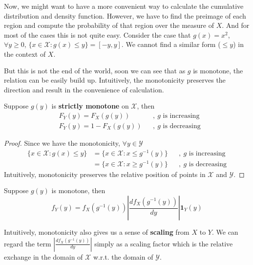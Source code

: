 \documentclass[11pt]{article}
\begin{document}
Now, we might want to have a more convenient way to calculate the cumulative distribution and density function. However, we have to find the preimage of each region and compute the probability of that region over the measure of $X$. And for most of the cases this is not quite easy. Consider the case that $g(x) = x^2$, $\forall y\geq 0$, $\{x\in\mathcal{X}:g(x)\leq y \} = [-y,y]$. We cannot find a similar form ($\leq y$) in the context of $X$.

But this is not the end of the world, soon we can see that as $g$ is monotone, the relation can be easily build up. Intuitively, the monotonicity preserves the direction and result in the convenience of calculation.

\begin{property}
	Suppose $g(y)$ is {\bf strictly monotone} on $\mathcal{X}$, then
	\begin{align*}
	&F_Y(y) = F_X(g(y))&&,\ g\mbox{ is increasing}\\
	&F_Y(y) = 1- F_X(g(y))&&,\ g\mbox{ is decreasing}
	\end{align*}
\end{property}
\begin{proof}
	Since we have the monotonicity, $\forall y\in\mathcal{Y}$
	\begin{align*}
	\{x\in\mathcal{X}: g(x)\leq y \} &= \{x\in\mathcal{X}: x\leq g^{-1}(y) \}&&,\ g\mbox{ is increasing}\\
	&= \{x\in\mathcal{X}: x\geq g^{-1}(y) \}&&,\ g\mbox{ is decreasing}
	\end{align*}
	Intuitively, monotonicity preserves the relative position of points in $\mathcal{X}$ and $\mathcal{Y}$.
\end{proof}

\begin{property}
	Suppose $g(y)$ is monotone, then
	$$f_Y(y) = f_X(g^{-1}(y)) |\frac{df_X(g^{-1}(y))}{dy}| \mathbf{1}_Y(y)$$
\end{property}
Intuitively, monotonicity also gives us a sense of {\bf scaling} from $X$ to $Y$. We can regard the term $|\frac{df_X(g^{-1}(y))}{dy}|$ simply as a scaling factor which is the relative exchange in the domain of $\mathcal{X}$ w.r.t. the domain  of $\mathcal{Y}$.
\end{document}
